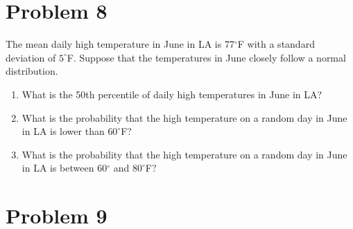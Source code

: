 \documentclass[12pt,twoside]{article}
\newcommand{\pts}[1]{\marginpar{ \small\hspace{0pt} \textit{[#1]} } }
\newcommand{\?}{\stackrel{?}{=}}
\newcommand{\gr}{\color{green!40!black}}
\begin{document}
 
\eject


\section*{Problem 8  }
The mean daily high temperature in June in LA is 77$^{\circ}$F with a  standard deviation of $5^{\circ}$F.  Suppose
that the temperatures in June closely follow a normal distribution.

\begin{enumerate}[\bf (a)]


\item What is the 50th \pts{1}  percentile of daily high temperatures in June in LA?
\vspace{10ex}

\item What is the \pts{3} probability that the high temperature on a random day in June in LA is lower than $60^{\circ}$F?
  \vspace{30ex}


  \item What is the \pts{3} probability that the high temperature on a random day in June in LA is between 60$^{\circ}$ and $80^{\circ}$F?
  \vspace{30ex}


\end{enumerate}




\eject
\section*{Problem 9 }
\end{document}
